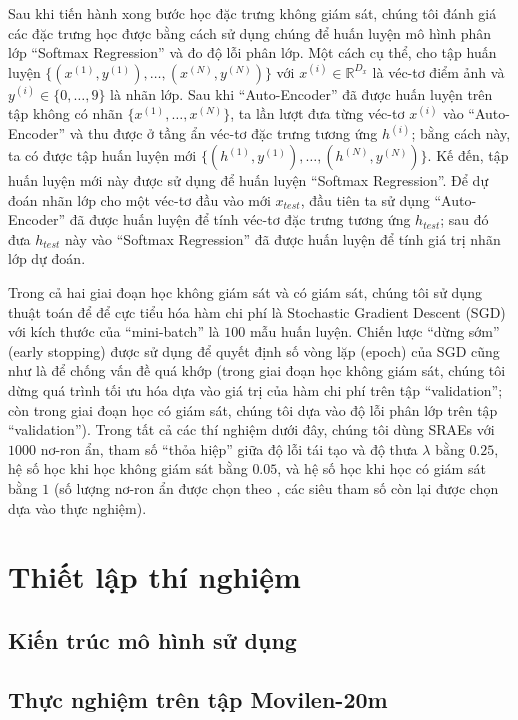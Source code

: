 Sau khi tiến hành xong bước học đặc trưng không giám sát, chúng tôi đánh giá các đặc trưng học được bằng cách sử dụng chúng để huấn luyện mô hình phân lớp ``Softmax Regression'' và đo độ lỗi phân lớp. Một cách cụ thể, cho tập huấn luyện $\{(x^{(1)}, y^{(1)}), \ldots, (x^{(N)}, y^{(N)})\}$ với $x^{(i)} \in \mathbb{R}^{D_x}$ là véc-tơ điểm ảnh và $y^{(i)} \in \{0, \ldots, 9\}$ là nhãn lớp. Sau khi ``Auto-Encoder'' đã được huấn luyện trên tập không có nhãn $\{x^{(1)}, \ldots, x^{(N)}\}$, ta lần lượt đưa từng véc-tơ $x^{(i)}$ vào ``Auto-Encoder'' và thu được ở tầng ẩn véc-tơ đặc trưng tương ứng $h^{(i)}$; bằng cách này, ta có được tập huấn luyện mới $\{(h^{(1)}, y^{(1)}), \ldots, (h^{(N)}, y^{(N)})\}$. Kế đến, tập huấn luyện mới này được sử dụng để huấn luyện ``Softmax Regression''. Để dự đoán nhãn lớp cho một véc-tơ đầu vào mới $x_{test}$, đầu tiên ta sử dụng ``Auto-Encoder'' đã được huấn luyện để tính véc-tơ đặc trưng tương ứng $h_{test}$; sau đó đưa $h_{test}$ này vào ``Softmax Regression'' đã được huấn luyện để tính giá trị nhãn lớp dự đoán.

Trong cả hai giai đoạn học không giám sát và có giám sát, chúng tôi sử dụng thuật toán để để cực tiểu hóa hàm chi phí là Stochastic Gradient Descent (SGD) với kích thước của ``mini-batch'' là $100$ mẫu huấn luyện. Chiến lược ``dừng sớm'' (early stopping) được sử dụng để quyết định số vòng lặp (epoch) của SGD cũng như là để chống vấn đề quá khớp (trong giai đoạn học không giám sát, chúng tôi dừng quá trình tối ưu hóa dựa vào giá trị của hàm chi phí trên tập ``validation''; còn trong giai đoạn học có giám sát, chúng tôi dựa vào độ lỗi phân lớp trên tập ``validation''). Trong tất cả các thí nghiệm dưới đây, chúng tôi dùng SRAEs với $1000$ nơ-ron ẩn, tham số ``thỏa hiệp'' giữa độ lỗi tái tạo và độ thưa $\lambda$ bằng $0.25$, hệ số học khi học không giám sát bằng $0.05$, và hệ số học khi học có giám sát bằng $1$ (số lượng nơ-ron ẩn được chọn theo \cite{rifai2011HCAEs}, các siêu tham số còn lại được chọn dựa vào thực nghiệm).
\section{Thiết lập thí nghiệm}
\subsection{Kiến trúc mô hình sử dụng}
\subsection{Thực nghiệm trên tập Movilen-20m}

